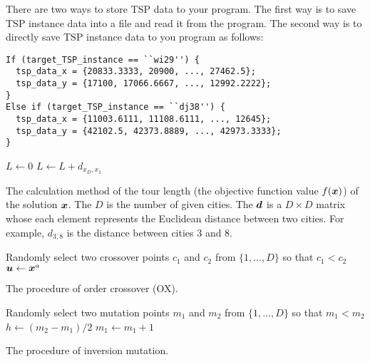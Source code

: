 \documentclass[11pt]{article}
\def\vector#1{\mbox{\boldmath $#1$}}
\def\vector#1{\mbox{\boldmath $#1$}}
\begin{document}
There are two ways to store TSP data to your program.
The first way is to save TSP instance data into a file and read it from the program.
The second way is to directly save TSP instance data to you program as follows:


\begin{lstlisting}[basicstyle=\ttfamily\footnotesize, frame=single]
If (target_TSP_instance == ``wi29'') {
  tsp_data_x = {20833.3333, 20900, ..., 27462.5};
  tsp_data_y = {17100, 17066.6667, ..., 12992.2222};
}
Else if (target_TSP_instance == ``dj38'') {
  tsp_data_x = {11003.6111, 11108.6111, ..., 12645};
  tsp_data_y = {42102.5, 42373.8889, ..., 42973.3333};
}
 \end{lstlisting}


\IncMargin{0.5em}
\begin{algorithm}[t]
{}
\SetSideCommentRight
$L \leftarrow 0$\;
$L \leftarrow L + d_{x_D, x_1}$\;
\caption{The calculation method of the tour length (the objective function value $f(\vector{x})$) of the solution $\vector{x}$. The $D$ is the number of given cities. The $\vector{d}$ is a $D \times D$ matrix whose each element represents the Euclidean distance between two cities. For example, $d_{3, 8}$ is the distance between cities 3 and 8.}
\label{alg:calculation_tour_length}
\end{algorithm}\DecMargin{0.5em}


\IncMargin{0.5em}
\begin{algorithm}[t]
{}
\SetSideCommentRight
Randomly select two crossover points $c_1$ and $c_2$ from $\{1, ..., D\}$ so that $c_1 < c_2$\;
$\vector{u} \leftarrow \vector{x}^a$\;
\caption{The procedure of order crossover (OX).}
\label{alg:ox}
\end{algorithm}\DecMargin{0.5em}


\IncMargin{0.5em}
\begin{algorithm}[t]
{}
\SetSideCommentRight
Randomly select two mutation points $m_1$ and $m_2$ from $\{1, ..., D\}$ so that $m_1 < m_2$\;
$h \leftarrow (m_2 - m_1) / 2$\;
$m_1 \leftarrow m_1 + 1$\;

\caption{The procedure of inversion mutation.}
\label{alg:mut_inversion}
\end{algorithm}\DecMargin{0.5em}
\end{document}
